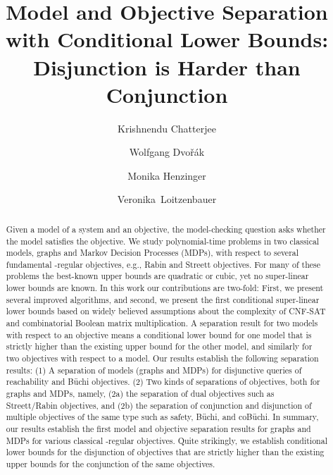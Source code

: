 \documentclass[11pt,letterpaper]{article}
\newif\iffullversion
\newcommand{\infull}[1]{\iffullversion #1\fi}
\begin{document}
\title{Model and Objective Separation with Conditional Lower Bounds: Disjunction is Harder than Conjunction}
\author[1]{Krishnendu Chatterjee}
\author[2]{Wolfgang Dvo{\v r}{\' a}k}
\author[2]{Monika Henzinger}
\author[2]{Veronika~Loitzenbauer}

\maketitle

\begin{abstract}
Given a model of a system and an objective, the model-checking question asks 
whether the model satisfies the objective. We study polynomial-time problems in 
two classical models, graphs and Markov Decision Processes (MDPs), with respect to 
several fundamental -regular objectives, e.g., Rabin and Streett objectives. 
For many of these problems the best-known upper bounds are quadratic or cubic, 
yet no super-linear lower bounds are known. 
In this work our contributions are two-fold: First, we present several improved 
algorithms, and second, we present the first conditional super-linear lower bounds 
based on widely believed assumptions about the complexity of CNF-SAT and combinatorial Boolean 
matrix multiplication. 
A separation result for two models with respect to an objective means a conditional 
lower bound for one model that is strictly higher than the existing upper bound 
for the other model, and similarly for two objectives with respect to a model. 
Our results establish the following separation results: 
(1) A separation of models (graphs and MDPs) for disjunctive queries of 
reachability and B\"uchi objectives.
(2) Two kinds of separations of objectives, both for graphs and MDPs, namely, 
(2a) the separation of dual objectives such as \infull{reachability/safety (for 
disjunctive questions) and }Streett/Rabin objectives, and (2b) the separation of
conjunction and disjunction of multiple objectives of the same type such as safety, B\"uchi, and coB\"uchi. 
In summary, our results establish the first model and objective separation 
results for graphs and MDPs for various classical -regular objectives. 
Quite strikingly, we establish conditional lower bounds for the disjunction of
objectives that are strictly higher than the existing upper bounds for the 
conjunction of the same objectives.

\end{abstract}
\end{document}
